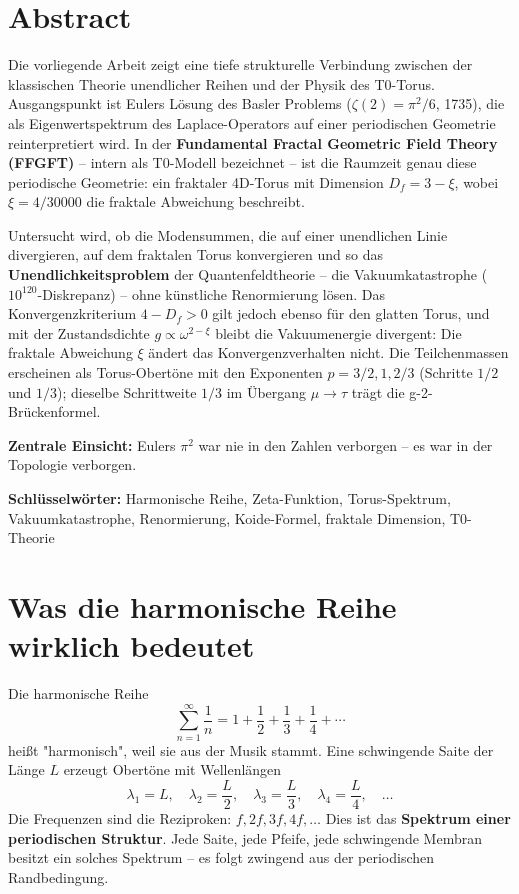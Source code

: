 	\section*{Abstract}
	Die vorliegende Arbeit zeigt eine tiefe strukturelle Verbindung zwischen der klassischen Theorie unendlicher Reihen und der Physik des T0-Torus. Ausgangspunkt ist Eulers Lösung des Basler Problems ($\zeta(2) = \pi^2/6$, 1735), die als Eigenwertspektrum des Laplace-Operators auf einer periodischen Geometrie reinterpretiert wird. In der \textbf{Fundamental Fractal Geometric Field Theory (FFGFT)} -- intern als T0-Modell bezeichnet -- ist die Raumzeit genau diese periodische Geometrie: ein fraktaler 4D-Torus mit Dimension $D_f = 3 - \xi$, wobei $\xi = 4/30000$ die fraktale Abweichung beschreibt.
	
	Untersucht wird, ob die Modensummen, die auf einer unendlichen Linie divergieren, auf dem fraktalen Torus konvergieren und so das \textbf{Unendlichkeitsproblem} der Quantenfeldtheorie -- die Vakuumkatastrophe ($10^{120}$-Diskrepanz) -- ohne künstliche Renormierung lösen. Das Konvergenzkriterium $4 - D_f > 0$ gilt jedoch ebenso für den glatten Torus, und mit der Zustandsdichte $g \propto \omega^{2-\xi}$ bleibt die Vakuumenergie divergent: Die fraktale Abweichung $\xi$ ändert das Konvergenzverhalten nicht. Die Teilchenmassen erscheinen als Torus-Obertöne mit den Exponenten $p = 3/2, 1, 2/3$ (Schritte $1/2$ und $1/3$); dieselbe Schrittweite $1/3$ im Übergang $\mu \to \tau$ trägt die g-2-Brückenformel.
	
	\textbf{Zentrale Einsicht:} Eulers $\pi^2$ war nie in den Zahlen verborgen -- es war in der Topologie verborgen.
	
	\textbf{Schlüsselwörter:} Harmonische Reihe, Zeta-Funktion, Torus-Spektrum, Vakuumkatastrophe, Renormierung, Koide-Formel, fraktale Dimension, T0-Theorie
	
	
	\section{Was die harmonische Reihe wirklich bedeutet}
	
	Die harmonische Reihe
	\begin{equation}
		\sum_{n=1}^{\infty} \frac{1}{n} = 1 + \frac{1}{2} + \frac{1}{3} + \frac{1}{4} + \cdots
		\label{eq:harmonic}
	\end{equation}
	heißt "harmonisch", weil sie aus der Musik stammt. Eine schwingende Saite der Länge $L$ erzeugt Obertöne mit Wellenlängen
	\begin{equation}
		\lambda_1 = L, \quad \lambda_2 = \frac{L}{2}, \quad \lambda_3 = \frac{L}{3}, \quad \lambda_4 = \frac{L}{4}, \quad \ldots
	\end{equation}
	Die Frequenzen sind die Reziproken: $f, 2f, 3f, 4f, \ldots$ Dies ist das \textbf{Spektrum einer periodischen Struktur}. Jede Saite, jede Pfeife, jede schwingende Membran besitzt ein solches Spektrum -- es folgt zwingend aus der periodischen Randbedingung.
	
